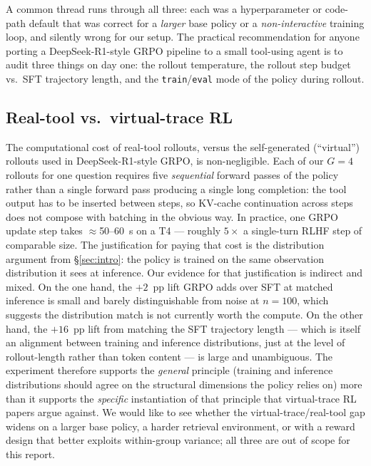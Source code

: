 \documentclass[11pt]{article}
\begin{document}
A common thread runs through all three: each was a hyperparameter
or code-path default that was correct for a \emph{larger} base
policy or a \emph{non-interactive} training loop, and silently
wrong for our setup. The practical recommendation for anyone
porting a DeepSeek-R1-style GRPO pipeline to a small tool-using
agent is to audit three things on day one: the rollout
temperature, the rollout step budget vs.\ SFT trajectory length,
and the \texttt{train}/\texttt{eval} mode of the policy during
rollout.

\subsection{Real-tool vs.\ virtual-trace RL}
\label{sec:real-vs-virtual}

The computational cost of real-tool rollouts, versus the
self-generated (``virtual'') rollouts used in DeepSeek-R1-style
GRPO, is non-negligible. Each of our $G{=}4$ rollouts for one
question requires five \emph{sequential} forward passes of the
policy rather than a single forward pass producing a single long
completion: the tool output has to be inserted between steps, so
KV-cache continuation across steps does not compose with batching
in the obvious way. In practice, one GRPO update step takes
$\approx$50--60~s on a T4 --- roughly $5{\times}$ a single-turn
RLHF step of comparable size. The justification for paying that
cost is the distribution argument from §\ref{sec:intro}: the
policy is trained on the same observation distribution it sees at
inference. Our evidence for that justification is indirect and
mixed. On the one hand, the $+2$~pp lift GRPO adds over SFT at
matched inference is small and barely distinguishable from noise
at $n{=}100$, which suggests the distribution match is not
currently worth the compute. On the other hand, the $+16$~pp lift
from matching the SFT trajectory length --- which is itself an
alignment between training and inference distributions, just at
the level of rollout-length rather than token content --- is
large and unambiguous. The experiment therefore supports the
\emph{general} principle (training and inference distributions
should agree on the structural dimensions the policy relies on)
more than it supports the \emph{specific} instantiation of that
principle that virtual-trace RL papers argue against. We would
like to see whether the virtual-trace/real-tool gap widens on a
larger base policy, a harder retrieval environment, or with a
reward design that better exploits within-group variance; all
three are out of scope for this report.
\end{document}
